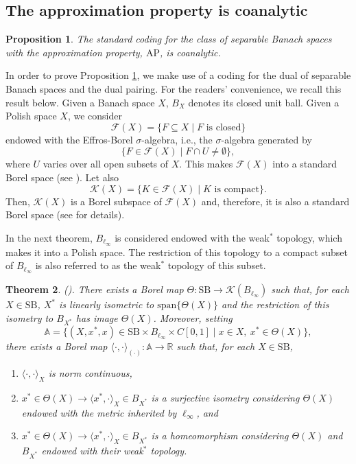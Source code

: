 \documentclass[letterpaper]{amsart}
\numberwithin{equation}{section}
\newtheorem{theorem}{Theorem}[section]
\newtheorem{proposition}[theorem]{Proposition}
\theoremstyle{definition}
\newcommand{\R}{{\mathbb{R}}}
\newcommand{\SB}{\mathrm{SB}}
\begin{document}
 \subsection{The approximation property is coanalytic}
  \label{SectionCoanalytic}


\begin{proposition}\label{ThmAPisCoanalytic}
    The standard coding for the class of separable Banach spaces with the approximation property, $\mathrm{AP}$, is coanalytic.
\end{proposition}

In order to prove Proposition \ref{ThmAPisCoanalytic}, we  make use of a coding for the dual of separable Banach spaces and the dual pairing. For the readers'  convenience, we recall this result below. Given a Banach space $X$, $B_X$ denotes its closed unit ball. Given a Polish space $X$, we consider  
\[\mathcal F(X)=\{F\subseteq X\mid F\text{ is closed}\}\]
endowed with the Effros-Borel $\sigma$-algebra, i.e., the  $\sigma$-algebra generated by 
\[\{F\in \mathcal F(X)\mid F\cap U\neq \emptyset\},\]
where $U$ varies over all open subsets of $X$. 
This makes $\mathcal F(X)$ into a  standard Borel space (see \cite[Sections 4.F and 12.C]{KechrisBook1995}). Let also  
\[\mathcal K(X)=\{K\in \mathcal F(X)\mid K\text{ is compact}\}.\]
Then, $\mathcal K(X)$ is a Borel subspace of $\mathcal F(X)$ and, therefore, it is also a standard Borel space (see \cite[Sections 4.F and 12.C]{KechrisBook1995} for details). 

In the next theorem, $B_{\ell_\infty}$ is considered endowed with the weak$^*$ topology, which makes it into a   Polish space. The restriction of this topology to a compact subset of $B_{\ell_\infty}$ is also referred to as the weak$^*$ topology of this subset.


\begin{theorem}\emph{(\cite[Theorem 1.3 and Lemma 3.2]{Braga2015AIFourier}).}
 There exists a Borel map $\Theta\colon \SB \to \mathcal K(B_{\ell_\infty})$ such
that, for each $X \in \SB$, $X^*$ is linearly isometric to $\mathrm{span}\{\Theta(X)\}$ and the restriction of this isometry to $B_{X^*}$ has image $ \Theta(X)$.
Moreover, setting
\[\mathbb A = \{(X, x^*, x
) \in \SB \times B_{\ell_\infty} \times C[0,1] \mid x\in  X,\ x^* \in\Theta(X)\},\]
there exists a Borel map $\langle \cdot, \cdot\rangle_{(\cdot)}\colon \mathbb A \to \R$ such that, for each $X \in  \SB$,
\begin{enumerate}
    \item\label{ThmDualityPairing.Item1} $\langle \cdot, \cdot\rangle_{X}$ is norm continuous,
\item\label{ThmDualityPairing.Item2} $ x^*\in  \Theta(X)\to \langle x^*, \cdot\rangle_{X}\in B_{X^*} $ is a surjective isometry considering $\Theta(X)$ endowed with the metric inherited by ${\ell_\infty}$, and 
\item \label{ThmDualityPairing.Item3} $ x^*\in  \Theta(X)\to \langle x^*, \cdot\rangle_{X}\in B_{X^*} $ is a homeomorphism considering   $\Theta(X)$ and  $B_{X^*}$ endowed with their    weak$^*$ topology.
\end{enumerate}\label{ThmDualityPairing}
\end{theorem}
\end{document}
